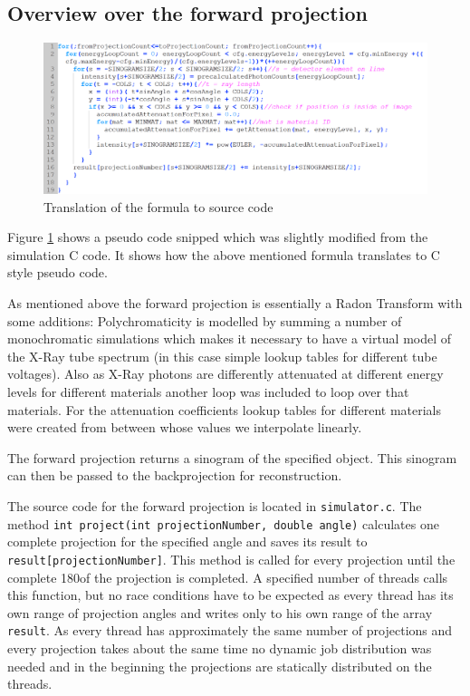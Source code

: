 \subsection{Overview over the forward projection}
\begin{figure}[h]
	\centering
	\includegraphics[width=\linewidth]{images/MainLoop.png}
	\caption{Translation of the formula to source code}
	\label{MainLoop}
\end{figure}
\par Figure \ref{MainLoop} shows a pseudo code snipped which was slightly modified from the simulation C code. It shows how the above mentioned formula translates to C style pseudo code.
\par As mentioned above the forward projection is essentially a Radon Transform with some additions: Polychromaticity is modelled by summing a number of monochromatic simulations which makes it necessary to have a virtual model of the X-Ray tube spectrum (in this case simple lookup tables for different tube voltages). Also as X-Ray photons are differently attenuated at different energy levels for different materials another loop was included to loop over that materials. For the attenuation coefficients lookup tables for different materials were created from \cite{AttenuationTable} between whose values we interpolate linearly.
\par The forward projection returns a sinogram of the specified object. This sinogram can then be passed to the backprojection for reconstruction.
\par The source code for the forward projection is located in \verb!simulator.c!. The method \verb!int project(int projectionNumber, double angle)! calculates one complete projection for the specified angle and saves its result to \verb!result[projectionNumber]!. This method is called for every projection until the complete 180\textdegree of the projection is completed. A specified number of threads calls this function, but no race conditions have to be expected as every thread has its own range of projection angles and writes only to his own range of the array \verb!result!. As every thread has approximately the same number of projections and every projection takes about the same time no dynamic job distribution was needed and in the beginning the projections are statically distributed on the threads.
